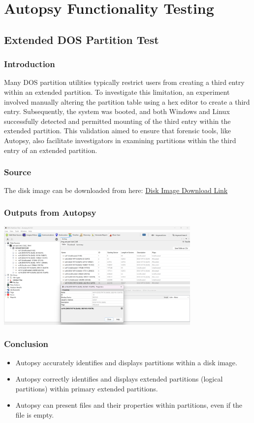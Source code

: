 \documentclass{extarticle}
\begin{document}
\section{Autopsy Functionality Testing}
\subsection{Extended DOS Partition Test}
\subsubsection*{Introduction}
Many DOS partition utilities typically restrict users from creating a third entry within an extended partition. To investigate this limitation, an experiment involved manually altering the partition table using a hex editor to create a third entry. Subsequently, the system was booted, and both Windows and Linux successfully detected and permitted mounting of the third entry within the extended partition. This validation aimed to ensure that forensic tools, like Autopsy, also facilitate investigators in examining partitions within the third entry of an extended partition.

\subsubsection*{Source}
The disk image can be downloaded from here: \href{http://prdownloads.sourceforge.net/dftt/1-extend-part.zip?download}{Disk Image Download Link}

\subsubsection*{Outputs from Autopsy}
\begin{center}
    \includegraphics[width=0.75\textwidth]{6/6.1/Extended DOS Partition.png}
\end{center}

\subsubsection*{Conclusion}
\begin{itemize}
    \item Autopsy accurately identifies and displays partitions within a disk image.
    \item Autopsy correctly identifies and displays extended partitions (logical partitions) within primary extended partitions.
    \item Autopsy can present files and their properties within partitions, even if the file is empty.
\end{itemize}
\end{document}
